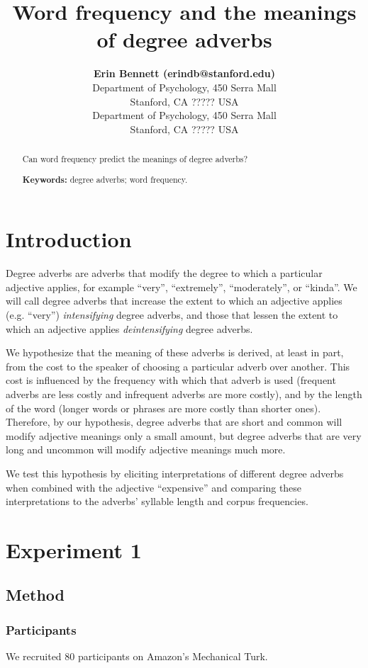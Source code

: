 \documentclass[10pt,letterpaper]{article}
\title{Word frequency and the meanings of degree adverbs}
\author{{\large \bf Erin Bennett (erindb@stanford.edu)} \\
  Department of Psychology, 450 Serra Mall \\
  Stanford, CA ????? USA
  \AND {\large \bf Noah Goodman (ngoodman@stanford.edu)} \\
  Department of Psychology, 450 Serra Mall \\
  Stanford, CA ????? USA}
\begin{document}
\maketitle

\begin{abstract}
Can word frequency predict the meanings of degree adverbs?

\textbf{Keywords:} 
degree adverbs; word frequency.
\end{abstract}

\section{Introduction}

Degree adverbs are adverbs that modify the degree to which a particular adjective applies, for example ``very'', ``extremely'', ``moderately'', or ``kinda''. We will call degree adverbs that increase the extent to which an adjective applies (e.g. ``very'') \emph{intensifying} degree adverbs, and those that lessen the extent to which an adjective applies \emph{deintensifying} degree adverbs.

We hypothesize that the meaning of these adverbs is derived, at least in part, from the cost to the speaker of choosing a particular adverb over another. This cost is influenced by the frequency with which that adverb is used (frequent adverbs are less costly and infrequent adverbs are more costly), and by the length of the word (longer words or phrases are more costly than shorter ones). Therefore, by our hypothesis, degree adverbs that are short and common will modify adjective meanings only a small amount, but degree adverbs that are very long and uncommon will modify adjective meanings much more.

We test this hypothesis by eliciting interpretations of different degree adverbs when combined with the adjective ``expensive'' and comparing these interpretations to the adverbs' syllable length and corpus frequencies.

\section{Experiment 1}
  \subsection{Method}
    \subsubsection{Participants}
    We recruited 80 participants on Amazon's Mechanical Turk.
\end{document}
